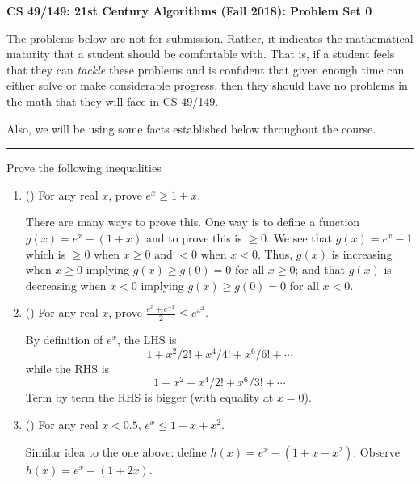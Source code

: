 \documentclass[11pt]{article}
\newcommand{\solution}[1]{\noindent {\color{blue} {\bf Solution:}} {\color{gray} {#1}}}
\newcommand{\solution}[1]{\ignore{#1}}
\begin{document}
	\begin{center}
		{\bf \Large CS 49/149: 21st Century Algorithms (Fall 2018): Problem Set 0}
	\end{center}
\small{
The problems below are not for submission. Rather, it indicates the mathematical maturity that a student should be comfortable with.
That is, if a student feels that they can {\em tackle} these problems and is confident that given enough time can either solve or make considerable progress, then they should have no problems in the math that they will face in CS 49/149. 

Also, we will be using some facts established below throughout the course.
}
\vspace{1ex}
\hrule height 1pt
\vspace{1ex}
%
\begin{exercise}
	Prove the following inequalities
	\begin{enumerate}
		\item (\Coffeecup )
		For any real $x$,  prove $e^x \geq 1 + x$.
		
		\solution{
		There are many ways to prove this. One way is to define a function $g(x) = e^x - (1+x)$ and to prove this is $\geq 0$.
		We see that $\dot{g}(x) = e^x - 1$ which is $\geq 0$ when $x \geq 0$ and $< 0$ when $x < 0$. 
		Thus, $g(x)$ is increasing when $x\geq 0$ implying $g(x) \geq g(0) =0$ for all $x\geq 0$; and that 
		$g(x)$ is decreasing when $x < 0$ implying $g(x) \geq g(0) = 0$ for all $x < 0$. 
		}
		
		\item (\Coffeecup ) 
		For any real $x$, prove $\frac{e^x + e^{-x}}{2} \leq e^{x^2}$.
		
		\solution{
		By definition of $e^x$, the LHS is 
		\[
		1 + x^2/2! + x^4/4! + x^6/6! + \cdots
		\]
		while the RHS is
		\[
		1 + x^2 + x^4/2! + x^6/3! + \cdots 
		\]
		Term by term the RHS is bigger (with equality at $x = 0$).
		}
		
		\item (\Coffeecup \Coffeecup)
		For any real $x < 0.5$,  $e^x \leq 1 + x + x^2$.
		
		\solution{
		Similar idea to the one above: define $h(x) = e^x - (1 + x + x^2)$.
		Observe $\dot{h}(x) = e^x - (1+ 2x)$. 
		}
		
	\end{enumerate}
\end{exercise}

\vspace{2ex}
\end{document}
